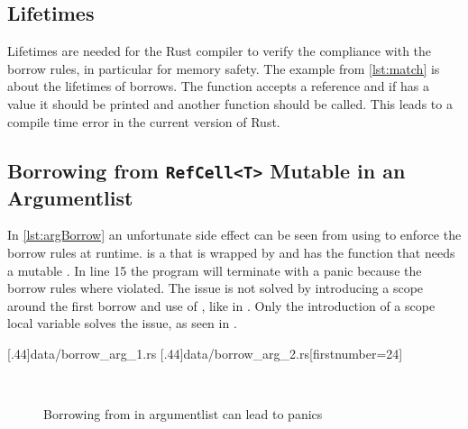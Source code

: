 \documentclass[thesis]{subfiles}
\begin{document}

  \subsection{Lifetimes}
    Lifetimes are needed for the Rust compiler to verify the compliance with the borrow rules, in particular for memory safety.
    The example from \autoref{lst:match} is about the lifetimes of borrows.
    The function \fun accepts a \Foo reference and if  has a value it should be printed and another function should be called.
    This leads to a compile time error in the current version of Rust.
    \autocite[2094-nll]{rust-rfc}


  \subsection{Borrowing from \texttt{RefCell<T>} Mutable in an Argumentlist}
    In \autoref{lst:argBorrow} an unfortunate side effect can be seen from using \RefCellT to enforce the borrow rules at runtime.
    \F is a \struct that is wrapped by \RefCellT and has the function \fun that needs a mutable \Self.
    In line 15 the program will terminate with a panic because the borrow rules where violated.
    The issue is not solved by introducing a scope around the first borrow and use of , like in \hun.
    Only the introduction of a scope local variable solves the issue, as seen in \nun.

    \LstTikzBox{\borrowArgOne}[.44\linewidth]{data/borrow_arg_1.rs}
    \LstTikzBox{\borrowArgTwo}[.44\linewidth]{data/borrow_arg_2.rs}[firstnumber=24]
    \begin{figure}[ht]
      \captionsetup{type=lstlisting}
      \centering
      \usebox{\borrowArgOne}\hfill%
      \usebox{\borrowArgTwo}\\\vspace*{.75em}%
      \caption{Borrowing from \RefCellT in argumentlist can lead to panics}\label{lst:argBorrow}
    \end{figure}
\end{document}
